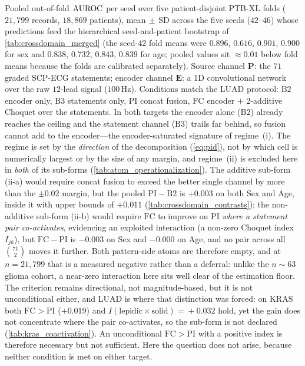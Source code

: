 \begin{flushleft}\footnotesize
Pooled out-of-fold $\text{AUROC}$ per seed over five patient-disjoint PTB-XL
folds ($21{,}799$ records, $18{,}869$ patients), mean$\,\pm\,$SD across
the five seeds ($42$--$46$) whose predictions feed the hierarchical
seed-and-patient bootstrap of \cref{tab:crossdomain_merged} (the
seed-$42$ fold means were $0.896$, $0.616$, $0.901$, $0.900$ for sex and
$0.838$, $0.732$, $0.843$, $0.839$ for age; pooled values sit
${\approx}0.01$ below fold means because the folds are calibrated
separately). Source channel $\mathbf{P}$:
the $71$ graded SCP-ECG statements; encoder channel $\mathbf{E}$: a
1D convolutional network over the raw $12$-lead signal ($100$\,Hz).
Conditions match the LUAD protocol: $\mathrm{B2}$ encoder only,
$\mathrm{B3}$ statements only, $\mathrm{PI}$ concat fusion, $\mathrm{FC}$
encoder $+$ 2-additive Choquet over the statements. In both targets the
encoder alone ($\mathrm{B2}$) already reaches the ceiling and the
statement channel ($\mathrm{B3}$) trails far behind, so fusion cannot add
to the encoder---the encoder-saturated signature of regime~(i). The
regime is set by the \emph{direction} of the decomposition
(\cref{eq:pid}), not by which cell is numerically largest or by the size
of any margin, and regime~(ii) is excluded here in \emph{both} of its
sub-forms (\cref{tab:atom_operationalization}). The additive sub-form
(ii-a) would require concat fusion to exceed the better single channel
by more than the $\pm0.02$ margin, but the pooled
$\mathrm{PI}-\mathrm{B2}$ is $+0.003$ on both Sex and Age, inside it
with upper bounds of $+0.011$ (\cref{tab:crossdomain_contrasts}); the
non-additive sub-form
(ii-b) would require $\mathrm{FC}$ to improve on $\mathrm{PI}$ \emph{where
a statement pair co-activates}, evidencing an exploited interaction (a
non-zero Choquet index $I_{jk}$), but $\mathrm{FC}-\mathrm{PI}$ is
$-0.003$ on Sex and $-0.000$ on Age, and no pair across all
$\binom{71}{2}$ moves it further. Both
pattern-side atoms are therefore empty, and at
$n\!=\!21{,}799$ that is a measured negative rather than a deferral:
unlike the $n\!\sim\!63$ glioma cohort, a near-zero interaction here sits
well clear of the estimation floor. The criterion remains directional,
not magnitude-based, but it is not unconditional either, and LUAD is
where that distinction was forced: on KRAS both
$\mathrm{FC}\!>\!\mathrm{PI}$ ($+0.019$) and
$I(\text{lepidic}\!\times\!\text{solid})\!=\!+0.032$ hold, yet the gain
does not concentrate where the pair co-activates, so the sub-form is not
declared (\cref{tab:kras_coactivation}). An unconditional
$\mathrm{FC}\!>\!\mathrm{PI}$ with a positive index is therefore
necessary but not sufficient. Here the question does not arise, because
neither condition is met on either target.
\end{flushleft}
